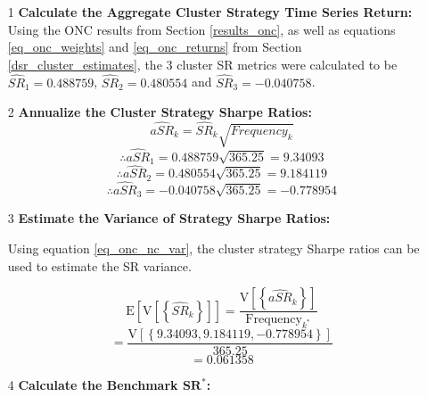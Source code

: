 \documentclass[a4paper,11pt,oneside]{article}
\theoremstyle{plain}
\theoremstyle{definition}
\begin{document}
	\begin{itemize}
		\item [1] \textbf{Calculate the Aggregate Cluster Strategy Time Series Return:} \newline
		Using the ONC results from Section \ref{results_onc}, as well as equations \eqref{eq_onc_weights} and \eqref{eq_onc_returns} from Section \ref{dsr_cluster_estimates}, the 3 cluster SR metrics were calculated to be $\widehat{SR}_{1}={0.488759}$, $\widehat{SR}_{2}={0.480554}$ and $\widehat{SR}_{3}={-0.040758}$. \newline
		
		\item [2] \textbf{Annualize the Cluster Strategy Sharpe Ratios:} \newline
		\begin{equation}
		\widehat{aSR}_{k}=\widehat{SR}_{k}\sqrt{{Frequency_{k}}}
		\end{equation}
		\begin{equation}
		\therefore \widehat{aSR}_{1}={0.488759}\sqrt{{365.25}} ={9.34093}
		\end{equation}
		\begin{equation}
		\therefore \widehat{aSR}_{2}={0.480554}\sqrt{{365.25}}={9.184119}
		\end{equation}
		\begin{equation}
		\therefore \widehat{aSR}_{3}={-0.040758}\sqrt{{365.25}} ={-0.778954}
		\end{equation}
		
		\item [3] \textbf{Estimate the Variance of Strategy Sharpe Ratios:} \newline
		
		Using equation \eqref{eq_onc_nc_var}, the cluster strategy Sharpe ratios can be used to estimate the SR variance. 
		
		\begin{equation}
		\mathrm{E}\left[\mathrm{V}\left[\left\{\widehat{S R}_{k}\right\}\right]\right]=\frac{\mathrm{V}\left[\left\{\widehat{aSR}_{k}\right\}\right]}{\text {Frequency}_{k^{*}}}
		\end{equation}
		\begin{equation}
		=\frac{\mathrm{V}\left[\left\{{9.34093,9.184119,-0.778954} \right\}\right]}{\text {365.25}}
		\end{equation}
		\begin{equation}
		={0.061358}
		\end{equation}
		
		\item [4] \textbf{Calculate the Benchmark $\mathbf{SR^*}$:} \newline
		

\end{itemize}
\end{document}
